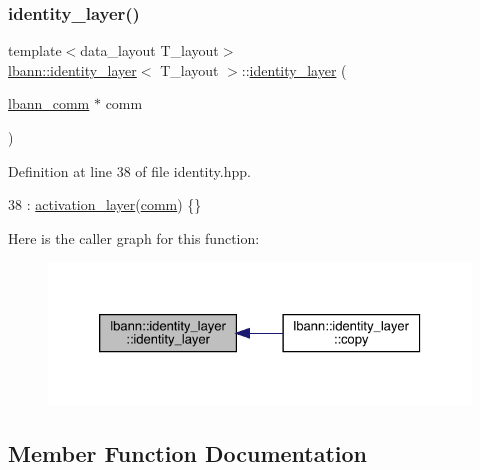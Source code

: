 \subsubsection{\texorpdfstring{identity\+\_\+layer()}{identity\_layer()}}
{\footnotesize\ttfamily template$<$data\+\_\+layout T\+\_\+layout$>$ \\
\hyperlink{classlbann_1_1identity__layer}{lbann\+::identity\+\_\+layer}$<$ T\+\_\+layout $>$\+::\hyperlink{classlbann_1_1identity__layer}{identity\+\_\+layer} (\begin{DoxyParamCaption}\item[{\hyperlink{classlbann_1_1lbann__comm}{lbann\+\_\+comm} $\ast$}]{comm }\end{DoxyParamCaption})\hspace{0.3cm}{\ttfamily [inline]}}



Definition at line 38 of file identity.\+hpp.


\begin{DoxyCode}
38 : \hyperlink{classlbann_1_1activation__layer_a7df6f5d21ccdd5a24ad6233a52807c6d}{activation\_layer}(\hyperlink{file__io_8cpp_ab048c6f9fcbcfaa57ce68b00263dbebe}{comm}) \{\}
\end{DoxyCode}
Here is the caller graph for this function\+:\nopagebreak
\begin{figure}[H]
\begin{center}
\leavevmode
\includegraphics[width=326pt]{classlbann_1_1identity__layer_ad6392bffa4f10325e129b64e3bcc4599_icgraph}
\end{center}
\end{figure}


\subsection{Member Function Documentation}
\mbox{\label{classlbann_1_1identity__layer_a1f6c975af032caea84155bda8b9c9801}} 
